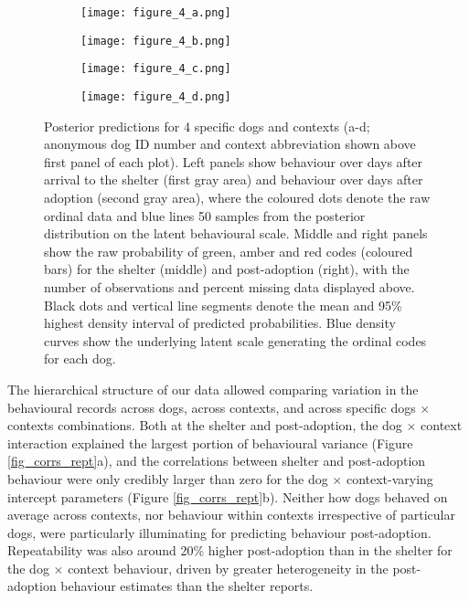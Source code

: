 \documentclass[12pt]{article}
\begin{document}
\begin{figure}[t!]
  \centering
  \begin{subfigure}{1\textwidth}
    \centering
    \texttt{[image: figure\_4\_a.png]}
  \end{subfigure}
  \begin{subfigure}{1\textwidth}
    \centering
    \vspace{-0.6cm}
    \texttt{[image: figure\_4\_b.png]}
  \end{subfigure}
  \begin{subfigure}{1\textwidth}
    \centering
    \vspace{-0.6cm}
    \texttt{[image: figure\_4\_c.png]}
  \end{subfigure}
  \begin{subfigure}{1\textwidth}
    \centering
    \vspace{-0.6cm}
    \texttt{[image: figure\_4\_d.png]}
  \end{subfigure}%
  \caption{\footnotesize{
  Posterior predictions for 4 specific dogs and contexts (a-d; anonymous dog ID number and context abbreviation shown above first panel of each plot). Left panels show behaviour over days after arrival to the shelter (first gray area) and behaviour over days after adoption (second gray area), where the coloured dots denote the raw ordinal data and blue lines 50 samples from the posterior distribution on the latent behavioural scale. Middle and right panels show the raw probability of green, amber and red codes (coloured bars) for the shelter (middle) and post-adoption (right), with the number of observations and percent missing data displayed above. Black dots and vertical line segments denote the mean and 95\% highest density interval of predicted probabilities. Blue density curves show the underlying latent scale generating the ordinal codes for each dog.}
  }
  \label{fig_pps}
\end{figure}

The hierarchical structure of our data allowed comparing variation in the behavioural records across dogs, across contexts, and across specific dogs $\times$ contexts combinations. Both at the shelter and post-adoption, the dog $\times$ context interaction explained the largest portion of behavioural variance (Figure \ref{fig_corrs_rept}a), and the correlations between shelter and post-adoption behaviour were only credibly larger than zero for the dog $\times$ context-varying intercept parameters (Figure \ref{fig_corrs_rept}b). Neither how dogs behaved on average across contexts, nor behaviour within contexts irrespective of particular dogs, were particularly illuminating for predicting behaviour post-adoption. Repeatability was also around 20\% higher post-adoption than in the shelter for the dog $\times$ context behaviour, driven by greater heterogeneity in the post-adoption behaviour estimates than the shelter reports.
\end{document}
